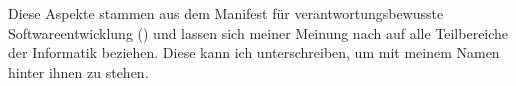\documentclass[a4paper, 11pt]{scrartcl}
\begin{document}
Diese Aspekte stammen aus dem Manifest für verantwortungsbewusste Softwareentwicklung (\cite{Loewe2015}) und lassen sich meiner Meinung nach auf alle Teilbereiche der Informatik beziehen. Diese kann ich unterschreiben, um mit meinem Namen hinter ihnen zu stehen.

\clearpage
\pagestyle{plain}

\newpage

\printbibliography














% 

% 
\end{document}
